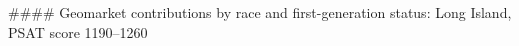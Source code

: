 #### Geomarket contributions by race and first-generation status: Long Island, PSAT score 1190–1260
